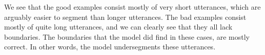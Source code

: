 We see that the good examples consist mostly of very short utterances, which are arguably easier to segment than longer utterances. The bad examples consist mostly of quite long utterances, and we can clearly see that they all lack boundaries. The boundaries that the model did find in these cases, are mostly correct. In other words, the model undersegments these utterances.
